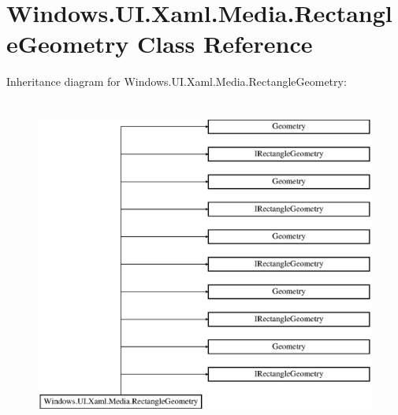 \hypertarget{class_windows_1_1_u_i_1_1_xaml_1_1_media_1_1_rectangle_geometry}{}\section{Windows.\+U\+I.\+Xaml.\+Media.\+Rectangle\+Geometry Class Reference}
\label{class_windows_1_1_u_i_1_1_xaml_1_1_media_1_1_rectangle_geometry}
Inheritance diagram for Windows.\+U\+I.\+Xaml.\+Media.\+Rectangle\+Geometry\+:\begin{figure}[H]
\begin{center}
\leavevmode
\includegraphics[height=11.000000cm]{class_windows_1_1_u_i_1_1_xaml_1_1_media_1_1_rectangle_geometry}
\end{center}
\end{figure}
